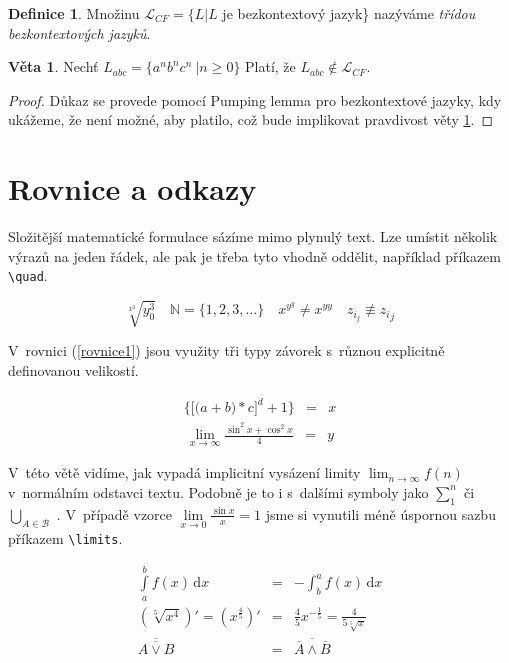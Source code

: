 \documentclass[a4paper, 11pt]{article}
\theoremstyle{definition} %
\newtheorem{veta}{Věta}   %
\newtheorem{definice}{Definice}[section] %
\begin{document}
\begin{definice}
Množinu $\mathcal{L}_{CF} = \{L | L$  je bezkontextový
jazyk\} nazýváme \textit{třídou bezkontextových jazyků}.
\end{definice}

\begin{veta}
Nechť $L_{abc} = \{a^n b^n c^n \ | n \geq 0 \}$ Platí, že $L_{abc} \not\in \mathcal{L}_{CF}$. \label{veta1}
\end{veta}

\begin{proof}
Důkaz se provede pomocí Pumping lemma pro bezkontextové jazyky, kdy ukážeme, že není možné, aby platilo, což bude implikovat pravdivost věty \ref{veta1}.
\end{proof}

\section{Rovnice a odkazy}

Složitější matematické formulace sázíme mimo plynulý text. Lze umístit několik výrazů na jeden řádek, ale pak je třeba tyto vhodně oddělit, například příkazem \verb|\quad|. 

$$\sqrt[x^2]{y^3_0} \quad \mathbb{N} = \{1,2,3,\ldots \} \quad x^{y^y} \neq x^{yy} \quad z_{i_j} \not\equiv {z_i}_j$$

V~rovnici (\ref{rovnice1}) jsou využity tři typy závorek s~různou explicitně definovanou velikostí.

\begin{eqnarray}
\bigg\{\Big[\big(a + b\big) * c\Big]^d + 1\bigg\}& = & x\label{rovnice1}
\end{eqnarray}
\begin{eqnarray*}
\lim_{x \to \infty}\frac{\sin^2 x + \cos^2 x}{4} &=& y
\end{eqnarray*}

V~této větě vidíme, jak vypadá implicitní vysázení limity $\lim_{n \to \infty}f(n)$ v~normálním odstavci textu. Podobně je to i s~dalšími symboly jako $\sum_1^n$ či $\bigcup_{A\in \mathcal{B}}$ . V~případě vzorce $\lim\limits_{x \to 0}\frac{\sin x}{x}=1$ jsme si vynutili méně úspornou sazbu příkazem \verb|\limits|.

\begin{eqnarray}
 \int\limits_a^b f(x)\,\mathrm{d}x &=& -\int_b^a f(x)\,\mathrm{d}x  \\
\left(\sqrt[5]{x^4}\right)' = \left(x^{\frac{4}{5}}\right)' &=& \frac{4}{5}x^{-\frac{1}{5}} = \frac{4}{5\sqrt[5]{x}}\\
\overline{\overline{A \vee B}} &=& \overline{\overline{A} \wedge \overline{B}}
\end{eqnarray}
\end{document}
